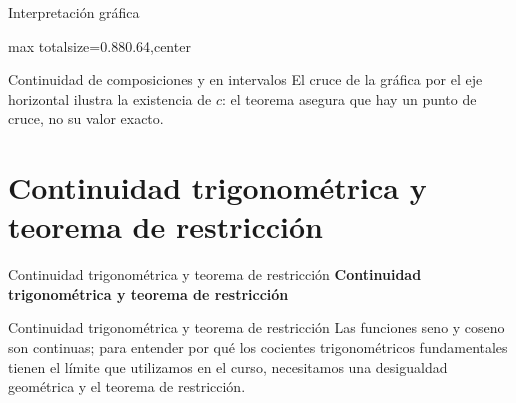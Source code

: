 \documentclass[12pt,aspectratio=169]{beamer}
\begin{document}
\begin{frame}[t,allowframebreaks]{Interpretación gráfica}
\begin{center}
\begin{adjustbox}{max totalsize={0.88\linewidth}{0.64\textheight},center}\end{adjustbox}
\end{center}
\end{frame}


\begin{frame}[t,allowframebreaks]{Continuidad de composiciones y en intervalos}
El cruce de la gráfica por el eje horizontal ilustra la existencia de $c$: el teorema asegura que hay un punto de cruce, no su valor exacto.

\end{frame}


\section{Continuidad trigonométrica y teorema de restricción}

\begin{frame}[t]{Continuidad trigonométrica y teorema de restricción}
\centering\vfill{\Large\bfseries\color{azul} Continuidad trigonométrica y teorema de restricción}\vfill
\end{frame}


\begin{frame}[t,allowframebreaks]{Continuidad trigonométrica y teorema de restricción}
Las funciones seno y coseno son continuas; para entender por qué los cocientes trigonométricos fundamentales tienen el límite que utilizamos en el curso, necesitamos una desigualdad geométrica y el teorema de restricción.
\end{frame}
\end{document}
